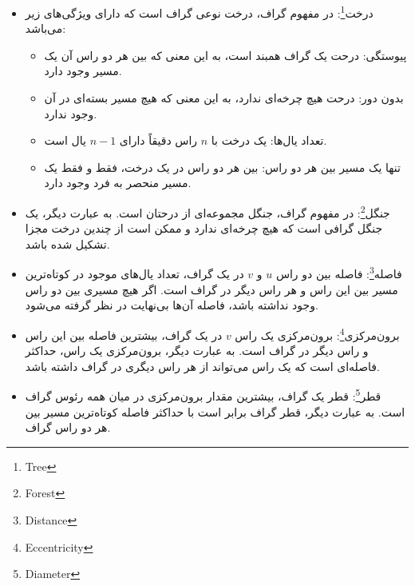 \documentclass[a4paper,10pt]{article}
\begin{document}
\begin{itemize}
        \item درخت\footnote{\hspace{2pt}Tree}: در مفهوم گراف، درخت نوعی گراف است که دارای ویژگی‌های زیر می‌باشد:
        
        \begin{itemize}
            
            \item پیوستگی: درحت یک گراف همبند است، به این معنی که بین هر دو راس آن یک مسیر وجود دارد.
            
            \item بدون دور: درحت هیچ چرخه‌ای ندارد، به این معنی که هیچ مسیر بسته‌ای در آن وجود ندارد.
            
            \item تعداد یال‌ها: یک درخت با $n$ راس دقیقاً دارای $n-1$ یال است.
            
            \item تنها یک مسیر بین هر دو راس: بین هر دو راس در یک درخت، فقط و فقط یک مسیر منحصر به فرد وجود دارد.

        \end{itemize}

        \item جنگل\footnote{\hspace{2pt}Forest}: در مفهوم گراف، جنگل مجموعه‌ای از درحتان است. به عبارت دیگر، یک جنگل گرافی است که هیچ چرخه‌ای ندارد و ممکن است از چندین درخت مجزا تشکیل شده باشد.
        
        \item فاصله\footnote{\hspace{2pt}Distance}: فاصله بین دو راس $u$ و $v$ در یک گراف، تعداد یال‌های موجود در کوتاه‌ترین مسیر بین این راس و هر راس دیگر در گراف است. اگر هیچ مسیری بین دو راس وجود نداشته باشد، فاصله آن‌ها بی‌نهایت در نظر گرفته می‌شود.
        
        \item برون‌مرکزی\footnote{\hspace{2pt}Eccentricity}: برون‌مرکزی یک راس $v$ در یک گراف، بیشترین فاصله بین این راس و راس دیگر در گراف است. به عبارت دیگر، برون‌مرکزی یک راس، حداکثر فاصله‌ای است که یک راس می‌تواند از هر راس دیگری در گراف داشته باشد.
        
        \item قطر\footnote{\hspace{2pt}Diameter}: قطر یک گراف، بیشترین مقدار برون‌مرکزی در میان همه رئوس گراف است. به عبارت دیگر، قطر گراف برابر است با حداکثر فاصله کوتاه‌ترین مسیر بین هر دو راس گراف.
        

\end{itemize}
\end{document}
